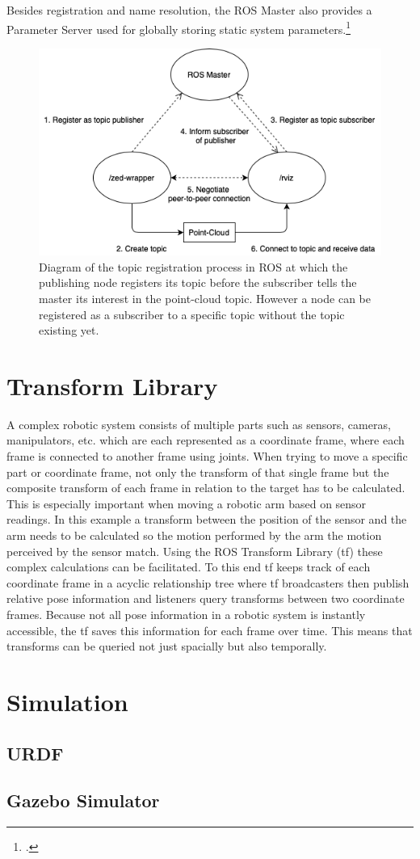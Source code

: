 Besides registration and name resolution, the ROS Master also provides a Parameter Server used for globally storing static system parameters.\footcite{openSourceRoboticsFoundationParameterServerNodate}
\begin{figure}[]
	\centering
	\includegraphics[width=0.8\linewidth]{img/ros_master_registration}
	\caption{Diagram of the topic registration process in ROS at which the publishing node registers its topic before the subscriber tells the master its interest in the point-cloud topic. However a node can be registered as a subscriber to a specific topic without the topic existing yet.}
		\label{fig:ros_master_reg}
\end{figure}



\section{Transform Library}
A complex robotic system consists of multiple parts such as sensors, cameras, manipulators, etc. which are each represented as a coordinate frame, where each frame is connected to another frame using joints. When trying to move a specific part or coordinate frame, not only the transform of that single frame but the composite transform of each frame in relation to the target has to be calculated. This is especially important when moving a robotic arm based on sensor readings. In this example a transform between the position of the sensor and the arm needs to be calculated so the motion performed by the arm the motion perceived by the sensor match.
Using the ROS Transform Library (tf) these complex calculations can be facilitated. To this end tf keeps track of each coordinate frame in a acyclic relationship tree where tf broadcasters then publish relative pose information and listeners query transforms between two coordinate frames. 
Because not all pose information in a robotic system is instantly accessible, the tf saves this information for each frame over time. This means that transforms can be queried not just spacially but also temporally.



\section{Simulation}



\subsection{URDF}



\subsection{Gazebo Simulator}



\filbreak